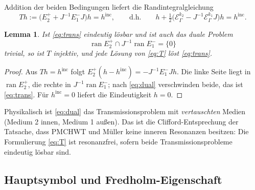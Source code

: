 \documentclass[11pt, a4paper]{article}
\newcommand{\EG}{\mathcal{E}_\Gamma}
\theoremstyle{plain}
\newtheorem{lemma}[satz]{Lemma}
\theoremstyle{definition}
\newcommand{\status}[1]{\hfill{\small\sffamily[#1]}}
\begin{document}
Addition der beiden Bedingungen liefert die Randintegralgleichung
\begin{equation}\label{eq:T}
  T h := \big(E_2^+ + J^{-1}E_1^-J\big)h = h^{\mathrm{inc}},
  \qquad\text{d.h.}\qquad
  h + \tfrac12\big(\EG^{k_2} - J^{-1}\EG^{k_1}J\big)h = h^{\mathrm{inc}} .
\end{equation}

\begin{lemma}\label{lem:Taequiv}\status{bewiesen}
Ist \eqref{eq:trans} eindeutig lösbar und ist auch das \emph{duale} Problem
\begin{equation}\label{eq:dual}
  \operatorname{ran}E_2^+\cap J^{-1}\operatorname{ran}E_1^- = \{0\}
\end{equation}
trivial, so ist $T$ injektiv, und jede Lösung von \eqref{eq:T} löst \eqref{eq:trans}.
\end{lemma}
\begin{proof}
Aus $Th = h^{\mathrm{inc}}$ folgt $E_2^+(h-h^{\mathrm{inc}}) = -J^{-1}E_1^-Jh$.
Die linke Seite liegt in $\operatorname{ran}E_2^+$, die rechte in
$J^{-1}\operatorname{ran}E_1^-$; nach \eqref{eq:dual} verschwinden beide, das ist
\eqref{eq:trans}. Für $h^{\mathrm{inc}}=0$ liefert die Eindeutigkeit $h=0$.
\end{proof}

Physikalisch ist \eqref{eq:dual} das Transmissionsproblem mit \emph{vertauschten}
Medien (Medium 2 innen, Medium 1 außen). Das ist die Clifford-Entsprechung der
Tatsache, dass PMCHWT und Müller keine inneren Resonanzen besitzen: Die
Formulierung \eqref{eq:T} ist resonanzfrei, sofern beide Transmissionsprobleme
eindeutig lösbar sind.

\subsection{Hauptsymbol und Fredholm-Eigenschaft}\label{sec:symbol}
\end{document}
